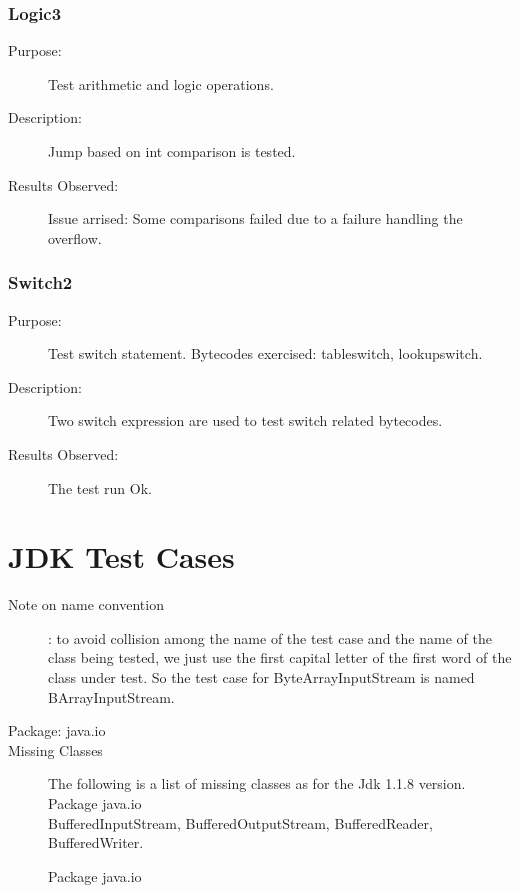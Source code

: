 \subsubsection{Logic3}
\begin{description}
   \item[Purpose:]
Test arithmetic and logic operations.
   \item[Description:]
Jump based on int comparison is tested.
   \item[Results Observed:]
Issue arrised: Some comparisons failed due to a failure handling the
overflow.
\end{description}


\subsubsection{Switch2}
\begin{description}
   \item[Purpose:]
Test switch statement. Bytecodes exercised: tableswitch,
lookupswitch.
   \item[Description:]
Two switch expression are used to test switch related bytecodes.
   \item[Results Observed:]
The test run Ok.
\end{description}

\section{JDK Test Cases}

\begin{description}
    \item[Note on name convention]

: to avoid collision among the name of the test case and the name of
the class being tested, we just use the first capital letter of the
first word of the class under test. So the test case for
ByteArrayInputStream is named BArrayInputStream.
    \item[Package: java.io]

    \item[Missing Classes]
The following is a list of missing classes as for the Jdk 1.1.8
version.
Package java.io\\
BufferedInputStream, BufferedOutputStream, BufferedReader, BufferedWriter.\\
\large \bf \begin{center} Package java.io \end{center}

\end{description}

